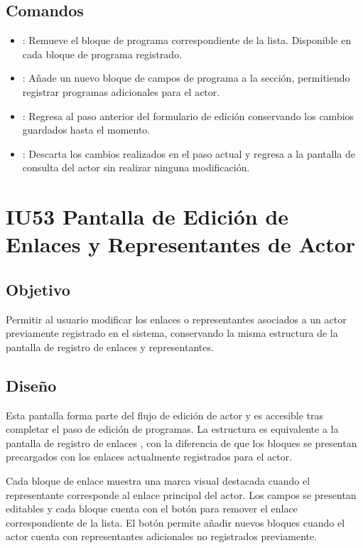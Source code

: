 \subsection{Comandos}
\begin{itemize}
	\item {}: Remueve el bloque de programa correspondiente de 
	la lista. Disponible en cada bloque de programa registrado.
	\item {}: Añade un nuevo bloque de campos de 
	programa a la sección, permitiendo registrar programas adicionales para el 
	actor.
	\item {}: Regresa al paso anterior del formulario de 
	edición conservando los cambios guardados hasta el momento.
	\item {}: Descarta los cambios realizados en el paso actual 
	y regresa a la pantalla de consulta del actor  sin realizar ninguna modificación.
\end{itemize}

\section{IU53 Pantalla de Edición de Enlaces y Representantes de Actor}
\subsection{Objetivo}
Permitir al usuario modificar los enlaces o representantes asociados a un actor 
previamente registrado en el sistema, conservando la misma estructura de la 
pantalla de registro de enlaces y representantes.

\subsection{Diseño}
Esta pantalla  forma parte del flujo de edición de actor y es accesible tras completar 
el paso de edición de programas. La estructura es equivalente a la pantalla de 
registro de enlaces , con la diferencia de que los bloques se presentan 
precargados con los enlaces actualmente registrados para el actor.

Cada bloque de enlace muestra una marca visual destacada cuando el representante 
corresponde al enlace principal del actor. Los campos se presentan editables y 
cada bloque cuenta con el botón  para remover el enlace 
correspondiente de la lista. El botón  permite añadir 
nuevos bloques cuando el actor cuenta con representantes adicionales no 
registrados previamente.

